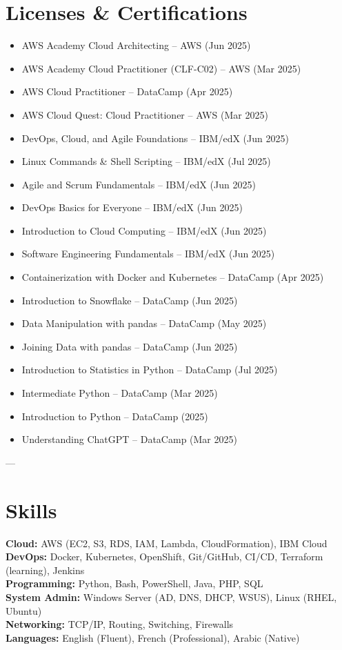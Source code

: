 \documentclass[a4paper,10pt]{article}
\begin{document}
\section*{Licenses \& Certifications}
\begin{itemize}[leftmargin=*]
    \item AWS Academy Cloud Architecting – AWS (Jun 2025)
    \item AWS Academy Cloud Practitioner (CLF-C02) – AWS (Mar 2025)
    \item AWS Cloud Practitioner – DataCamp (Apr 2025)
    \item AWS Cloud Quest: Cloud Practitioner – AWS (Mar 2025)
    \item DevOps, Cloud, and Agile Foundations – IBM/edX (Jun 2025)
    \item Linux Commands \& Shell Scripting – IBM/edX (Jul 2025)
    \item Agile and Scrum Fundamentals – IBM/edX (Jun 2025)
    \item DevOps Basics for Everyone – IBM/edX (Jun 2025)
    \item Introduction to Cloud Computing – IBM/edX (Jun 2025)
    \item Software Engineering Fundamentals – IBM/edX (Jun 2025)
    \item Containerization with Docker and Kubernetes – DataCamp (Apr 2025)
    \item Introduction to Snowflake – DataCamp (Jun 2025)
    \item Data Manipulation with pandas – DataCamp (May 2025)
    \item Joining Data with pandas – DataCamp (Jun 2025)
    \item Introduction to Statistics in Python – DataCamp (Jul 2025)
    \item Intermediate Python – DataCamp (Mar 2025)
    \item Introduction to Python – DataCamp (2025)
    \item Understanding ChatGPT – DataCamp (Mar 2025)
\end{itemize}

---

\section*{Skills}
\textbf{Cloud:} AWS (EC2, S3, RDS, IAM, Lambda, CloudFormation), IBM Cloud \\
\textbf{DevOps:} Docker, Kubernetes, OpenShift, Git/GitHub, CI/CD, Terraform (learning), Jenkins \\
\textbf{Programming:} Python, Bash, PowerShell, Java, PHP, SQL \\
\textbf{System Admin:} Windows Server (AD, DNS, DHCP, WSUS), Linux (RHEL, Ubuntu) \\
\textbf{Networking:} TCP/IP, Routing, Switching, Firewalls \\
\textbf{Languages:} English (Fluent), French (Professional), Arabic (Native)
\end{document}
